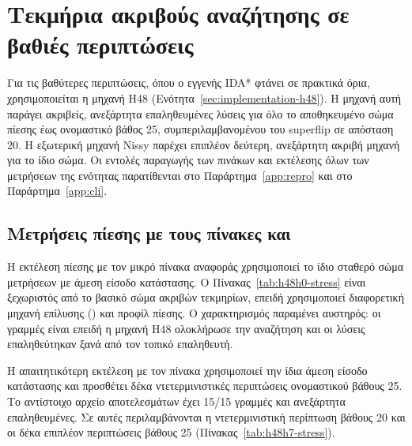 \section{Τεκμήρια ακριβούς αναζήτησης σε βαθιές περιπτώσεις}
\label{sec:experiments-h48}

Για τις βαθύτερες περιπτώσεις, όπου ο εγγενής IDA* φτάνει σε πρακτικά όρια, χρησιμοποιείται η μηχανή H48 (Ενότητα~\ref{sec:implementation-h48}). Η μηχανή αυτή παράγει ακριβείς, ανεξάρτητα επαληθευμένες λύσεις για όλο το αποθηκευμένο σώμα πίεσης έως ονομαστικό βάθος 25, συμπεριλαμβανομένου του superflip σε απόσταση 20. Η εξωτερική μηχανή Nissy παρέχει επιπλέον δεύτερη, ανεξάρτητη ακριβή μηχανή για το ίδιο σώμα. Οι εντολές παραγωγής των πινάκων και εκτέλεσης όλων των μετρήσεων της ενότητας παρατίθενται στο Παράρτημα~\ref{app:repro} και στο Παράρτημα~\ref{app:cli}.

\subsection{Μετρήσεις πίεσης με τους πίνακες  και }
\label{sec:experiments-h48-stress}

Η εκτέλεση πίεσης με τον μικρό πίνακα αναφοράς  χρησιμοποιεί το ίδιο σταθερό σώμα μετρήσεων με άμεση είσοδο κατάστασης. Ο Πίνακας~\ref{tab:h48h0-stress} είναι ξεχωριστός από το βασικό σώμα ακριβών τεκμηρίων, επειδή χρησιμοποιεί διαφορετική μηχανή επίλυσης () και προφίλ πίεσης. Ο χαρακτηρισμός παραμένει αυστηρός: οι γραμμές είναι  επειδή η μηχανή H48 ολοκλήρωσε την αναζήτηση και οι λύσεις επαληθεύτηκαν ξανά από τον τοπικό επαληθευτή.

\begin{table}[htbp]\centering

\caption[Αποτελέσματα πίεσης της μηχανής H48 με τον πίνακα h48h0]{Αποτελέσματα πίεσης της μηχανής H48 με τον πίνακα αναφοράς : όλες οι γραμμές, συμπεριλαμβανομένης της ντετερμινιστικής περίπτωσης ονομαστικού βάθους 20, ολοκληρώνονται ως . Πηγή: .}
\label{tab:h48h0-stress}
\end{table}

Η απαιτητικότερη εκτέλεση με τον πίνακα  χρησιμοποιεί την ίδια άμεση είσοδο κατάστασης και προσθέτει δέκα ντετερμινιστικές περιπτώσεις ονομαστικού βάθους 25. Το αντίστοιχο αρχείο αποτελεσμάτων έχει 15/15 γραμμές  και ανεξάρτητα επαληθευμένες. Σε αυτές περιλαμβάνονται η ντετερμινιστική περίπτωση βάθους 20 και οι δέκα επιπλέον περιπτώσεις βάθους 25 (Πίνακας~\ref{tab:h48h7-stress}).


